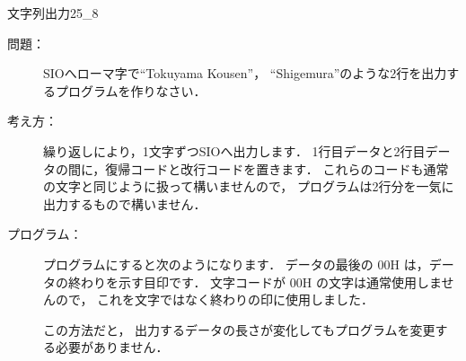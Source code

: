 \newpage
\begin{reidai}{文字列出力2}{5_8}
  \begin{description}
  \item[問題：] SIOへローマ字で``Tokuyama Kousen''，
    ``Shigemura''のような2行を出力するプログラムを作りなさい．

  \item[考え方：]
    繰り返しにより，1文字ずつSIOへ出力します．
    1行目データと2行目データの間に，復帰コードと改行コードを置きます．
    これらのコードも通常の文字と同じように扱って構いませんので，
    プログラムは2行分を一気に出力するもので構いません．

  \item[プログラム：]
    プログラムにすると次のようになります．
    データの最後の 00H は，データの終わりを示す目印です．
    文字コードが 00H の文字は通常使用しませんので，
    これを文字ではなく終わりの印に使用しました．

    この方法だと，
    出力するデータの長さが変化してもプログラムを変更する必要がありません．


\end{description}
\end{reidai}
